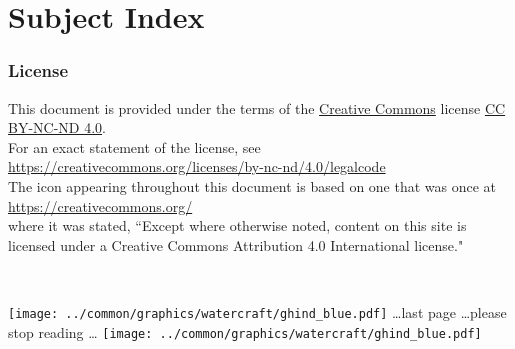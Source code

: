 \chapter*{Subject Index}
%
\begin{multicols}{3}
  
\end{multicols}

\subsection*{License}
This document is provided under the terms of 
the \href{https://creativecommons.org/}{Creative Commons} license \href{https://creativecommons.org/licenses/}{CC BY-NC-ND 4.0}.
\\For an exact statement of the license, see 
\\\indentx\url{https://creativecommons.org/licenses/by-nc-nd/4.0/legalcode}
\\
The icon 
appearing throughout this document is based on one that was once at 
\\\indentx\url{https://creativecommons.org/}\\
where it was stated, 
``Except where otherwise noted, content on this site is licensed under a Creative Commons Attribution 4.0 International license."

\cleartooddpage
\mbox{}\\\vfill
%
\begin{center}
\texttt{[image: ../common/graphics/watercraft/ghind\_blue.pdf]}%
{\sffamily\ldots last page \ldots please stop reading \ldots} 
\texttt{[image: ../common/graphics/watercraft/ghind\_blue.pdf]}%
\label{doc:end}
\end{center}













